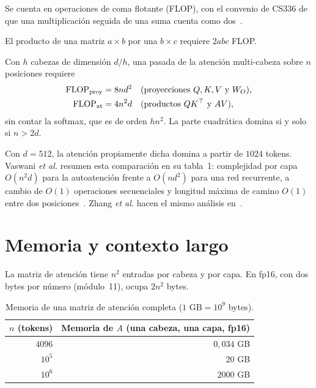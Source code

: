 Se cuenta en operaciones de coma flotante (FLOP), con el convenio de CS336 de que una multiplicación seguida de una suma cuenta como dos~\cite[§3.5]{cs336}.

\begin{lema}\label{lem:flops}
El producto de una matriz $a\times b$ por una $b\times c$ requiere $2abc$ FLOP.
\end{lema}

\begin{proposicion}\label{prop:coste}
Con $h$ cabezas de dimensión $d/h$, una pasada de la atención multi-cabeza sobre $n$ posiciones requiere
\begin{align*}
\mathrm{FLOP}_{\text{proy}}&=8nd^{2} &&\text{(proyecciones $Q,K,V$ y $W_{O}$)},\\
\mathrm{FLOP}_{\text{at}}&=4n^{2}d &&\text{(productos $QK^{\top}$ y $AV$)},
\end{align*}
sin contar la softmax, que es de orden $hn^{2}$. La parte cuadrática domina si y solo si $n>2d$.
\end{proposicion}

Con $d=512$, la atención propiamente dicha domina a partir de $1024$ tokens. Vaswani \emph{et al.} resumen esta comparación en su tabla~1: complejidad por capa $O(n^{2}d)$ para la autoatención frente a $O(nd^{2})$ para una red recurrente, a cambio de $O(1)$ operaciones secuenciales y longitud máxima de camino $O(1)$ entre dos posiciones~\cite[§4]{vaswani}. Zhang \emph{et al.} hacen el mismo análisis en~\cite[§11.6.2]{d2l}.

\section{Memoria y contexto largo}

La matriz de atención tiene $n^{2}$ entradas por cabeza y por capa. En fp16, con dos bytes por número (módulo~11), ocupa $2n^{2}$ bytes.

\begin{table}[h]
\centering
\begin{tabular}{@{}rr@{}}
\toprule
$n$ (tokens) & Memoria de $A$ (una cabeza, una capa, fp16) \\
\midrule
$4096$ & $0{,}034$ GB \\
$10^{5}$ & $20$ GB \\
$10^{6}$ & $2000$ GB \\
\bottomrule
\end{tabular}
\caption{Memoria de una matriz de atención completa ($1\text{ GB}=10^{9}$ bytes).}
\label{tab:memoria}
\end{table}


